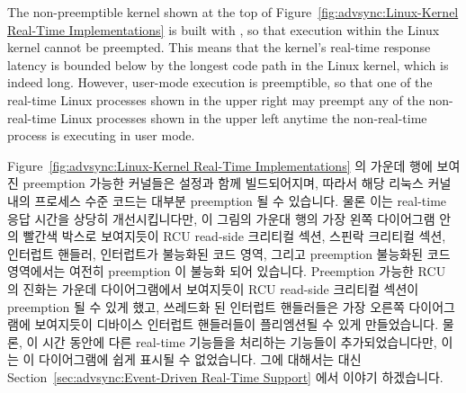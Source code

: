 The non-preemptible kernel shown at the top of
Figure~\ref{fig:advsync:Linux-Kernel Real-Time Implementations}
is built with , so that execution within the Linux
kernel cannot be preempted.
This means that the kernel's real-time response latency is bounded below
by the longest code path in the Linux kernel, which is indeed long.
However, user-mode execution is preemptible, so that one of the
real-time Linux processes shown in the upper right may preempt any of the
non-real-time Linux processes shown in the upper left anytime the
non-real-time process is executing in user mode.
\fi

Figure~\ref{fig:advsync:Linux-Kernel Real-Time Implementations}
의 가운데 행에 보여진 preemption 가능한 커널들은  설정과
함께 빌드되어지며, 따라서 해당 리눅스 커널 내의 프로세스 수준 코드는 대부분
preemption 될 수 있습니다.
물론 이는 real-time 응답 시간을 상당히 개선시킵니다만, 이 그림의 가운대 행의
가장 왼쪽 다이어그램 안의 빨간색 박스로 보여지듯이 RCU read-side 크리티컬 섹션,
스핀락 크리티컬 섹션, 인터럽트 핸들러, 인터럽트가 불능화된 코드 영역, 그리고
preemption 불능화된 코드 영역에서는 여전히 preemption 이 불능화 되어 있습니다.
Preemption 가능한 RCU 의 진화는 가운데 다이어그램에서 보여지듯이 RCU read-side
크리티컬 섹션이 preemption 될 수 있게 했고, 쓰레드화 된 인터럽트 핸들러들은
가장 오른쪽 다이어그램에 보여지듯이 디바이스 인터럽트 핸들러들이 플리엠션될 수
있게 만들었습니다.
물론, 이 시간 동안에 다른 real-time 기능들을 처리하는 기능들이
추가되었습니다만, 이는 이 다이어그램에 쉽게 표시될 수 없었습니다.
그에 대해서는 대신
Section~\ref{sec:advsync:Event-Driven Real-Time Support} 에서 이야기 하겠습니다.

